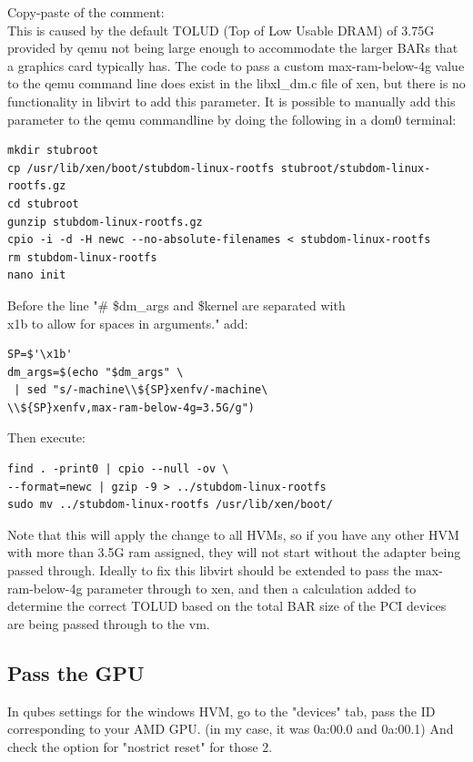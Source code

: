 \documentclass[12pt]{article}
\begin{document}
Copy-paste of the comment:\\

This is caused by the default TOLUD (Top of Low Usable DRAM) of 3.75G provided by qemu not being large enough to accommodate the larger BARs that a graphics card typically has.
The code to pass a custom max-ram-below-4g value to the qemu command line does exist in the libxl\_dm.c file of xen, but there is no functionality in libvirt to add this parameter.
It is possible to manually add this parameter to the qemu commandline by doing the following in a dom0 terminal:

\begin{verbatim}
mkdir stubroot
cp /usr/lib/xen/boot/stubdom-linux-rootfs stubroot/stubdom-linux-rootfs.gz
cd stubroot
gunzip stubdom-linux-rootfs.gz
cpio -i -d -H newc --no-absolute-filenames < stubdom-linux-rootfs
rm stubdom-linux-rootfs
nano init
\end{verbatim}

Before the line "\# \$dm\_args and \$kernel are separated with \\x1b to allow for spaces in arguments." add:
\begin{verbatim}
SP=$'\x1b'
dm_args=$(echo "$dm_args" \
 | sed "s/-machine\\${SP}xenfv/-machine\
\\${SP}xenfv,max-ram-below-4g=3.5G/g")
\end{verbatim}
Then execute:
\begin{verbatim}
find . -print0 | cpio --null -ov \
--format=newc | gzip -9 > ../stubdom-linux-rootfs
sudo mv ../stubdom-linux-rootfs /usr/lib/xen/boot/
\end{verbatim}

Note that this will apply the change to all HVMs, so if you have any other HVM with more than 3.5G ram assigned, they will not start without the adapter being passed through.
Ideally to fix this libvirt should be extended to pass the max-ram-below-4g parameter through to xen, and then a calculation added to determine the correct TOLUD based on the total BAR size of the PCI devices are being passed through to the vm.


\subsection{Pass the GPU}
In qubes settings for the windows HVM, go to the "devices" tab, pass the ID corresponding to your AMD GPU. (in my case, it was 0a:00.0 and 0a:00.1)
And check the option for "nostrict reset" for those 2.
\end{document}
